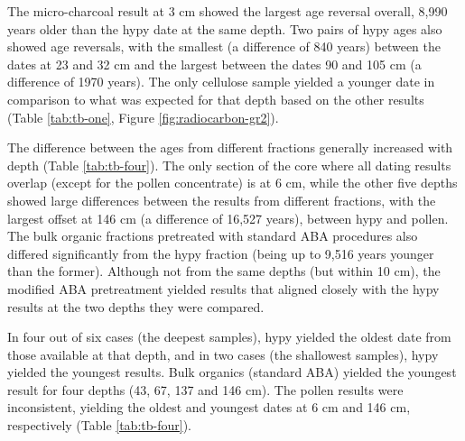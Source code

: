 \documentclass[
  12pt,
]{book}
\begin{document}
The micro-charcoal result at 3 cm showed the largest age reversal overall, 8,990 years older than the hypy date at the same depth. Two pairs of hypy ages also showed age reversals, with the smallest (a difference of 840 years) between the dates at 23 and 32 cm and the largest between the dates 90 and 105 cm (a difference of 1970 years). The only cellulose sample yielded a younger date in comparison to what was expected for that depth based on the other results (Table \ref{tab:tb-one}, Figure \ref{fig:radiocarbon-gr2}).

The difference between the ages from different fractions generally increased with depth (Table \ref{tab:tb-four}). The only section of the core where all dating results overlap (except for the pollen concentrate) is at 6 cm, while the other five depths showed large differences between the results from different fractions, with the largest offset at 146 cm (a difference of 16,527 years), between hypy and pollen. The bulk organic fractions pretreated with standard ABA procedures also differed significantly from the hypy fraction (being up to 9,516 years younger than the former). Although not from the same depths (but within 10 cm), the modified ABA pretreatment yielded results that aligned closely with the hypy results at the two depths they were compared.

In four out of six cases (the deepest samples), hypy yielded the oldest date from those available at that depth, and in two cases (the shallowest samples), hypy yielded the youngest results. Bulk organics (standard ABA) yielded the youngest result for four depths (43, 67, 137 and 146 cm). The pollen results were inconsistent, yielding the oldest and youngest dates at 6 cm and 146 cm, respectively (Table \ref{tab:tb-four}).
\end{document}
